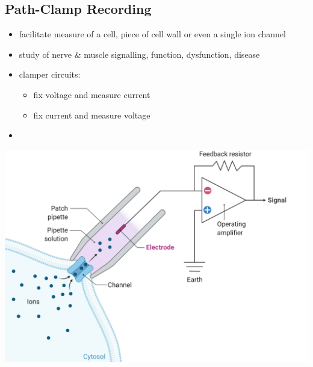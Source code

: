 \documentclass[11pt,fleqn]{book} %
\begin{document}
\subsection{Path-Clamp Recording}
\begin{itemize}
    \item facilitate measure of a cell, piece of cell wall or even a single ion channel
    \item study of nerve \& muscle signalling, function, dysfunction, disease
    \item clamper circuits:
    \begin{itemize}
        \item fix voltage and measure current
        \item fix current and measure voltage
    \end{itemize}
    \item 
\end{itemize}
\begin{center}
    \includegraphics[width=0.65\linewidth]{Pictures/Screenshot 2024-02-25 214256.png}
\end{center}
\end{document}
